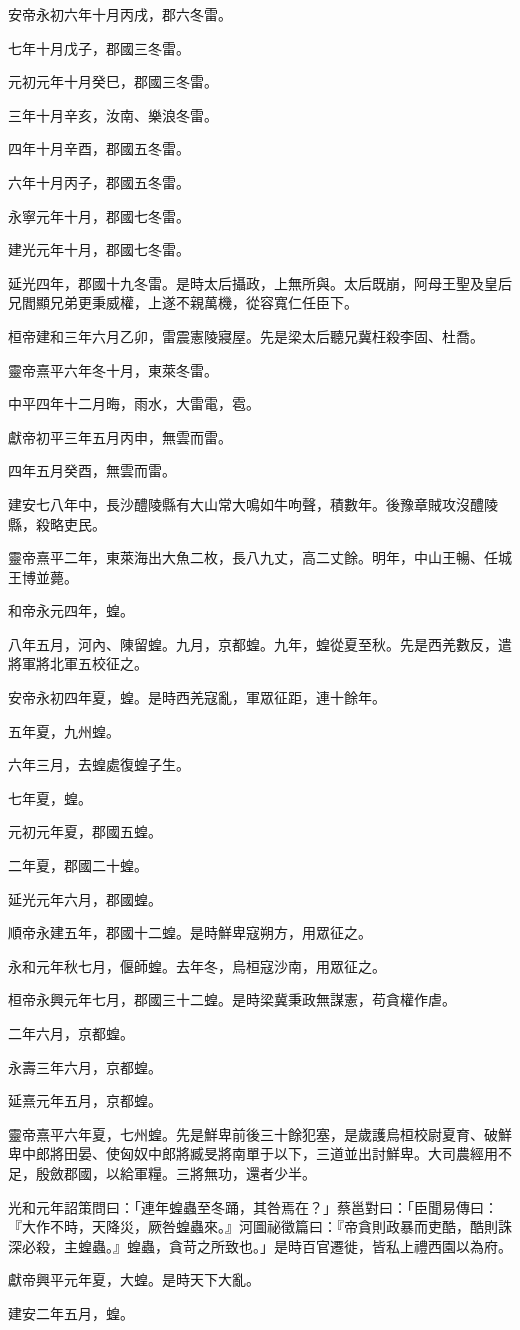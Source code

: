 \begin{pinyinscope}
安帝永初六年十月丙戌，郡六冬雷。

七年十月戊子，郡國三冬雷。

元初元年十月癸巳，郡國三冬雷。

三年十月辛亥，汝南、樂浪冬雷。

四年十月辛酉，郡國五冬雷。

六年十月丙子，郡國五冬雷。

永寧元年十月，郡國七冬雷。

建光元年十月，郡國七冬雷。

延光四年，郡國十九冬雷。是時太后攝政，上無所與。太后既崩，阿母王聖及皇后兄閻顯兄弟更秉威權，上遂不親萬機，從容寬仁任臣下。

桓帝建和三年六月乙卯，雷震憲陵寢屋。先是梁太后聽兄冀枉殺李固、杜喬。

靈帝熹平六年冬十月，東萊冬雷。

中平四年十二月晦，雨水，大雷電，雹。

獻帝初平三年五月丙申，無雲而雷。

四年五月癸酉，無雲而雷。

建安七八年中，長沙醴陵縣有大山常大鳴如牛呴聲，積數年。後豫章賊攻沒醴陵縣，殺略吏民。

靈帝熹平二年，東萊海出大魚二枚，長八九丈，高二丈餘。明年，中山王暢、任城王博並薨。

和帝永元四年，蝗。

八年五月，河內、陳留蝗。九月，京都蝗。九年，蝗從夏至秋。先是西羌數反，遣將軍將北軍五校征之。

安帝永初四年夏，蝗。是時西羌寇亂，軍眾征距，連十餘年。

五年夏，九州蝗。

六年三月，去蝗處復蝗子生。

七年夏，蝗。

元初元年夏，郡國五蝗。

二年夏，郡國二十蝗。

延光元年六月，郡國蝗。

順帝永建五年，郡國十二蝗。是時鮮卑寇朔方，用眾征之。

永和元年秋七月，偃師蝗。去年冬，烏桓寇沙南，用眾征之。

桓帝永興元年七月，郡國三十二蝗。是時梁冀秉政無謀憲，苟貪權作虐。

二年六月，京都蝗。

永壽三年六月，京都蝗。

延熹元年五月，京都蝗。

靈帝熹平六年夏，七州蝗。先是鮮卑前後三十餘犯塞，是歲護烏桓校尉夏育、破鮮卑中郎將田晏、使匈奴中郎將臧旻將南單于以下，三道並出討鮮卑。大司農經用不足，殷斂郡國，以給軍糧。三將無功，還者少半。

光和元年詔策問曰：「連年蝗蟲至冬踊，其咎焉在？」蔡邕對曰：「臣聞易傳曰：『大作不時，天降災，厥咎蝗蟲來。』河圖祕徵篇曰：『帝貪則政暴而吏酷，酷則誅深必殺，主蝗蟲。』蝗蟲，貪苛之所致也。」是時百官遷徙，皆私上禮西園以為府。

獻帝興平元年夏，大蝗。是時天下大亂。

建安二年五月，蝗。


\end{pinyinscope}